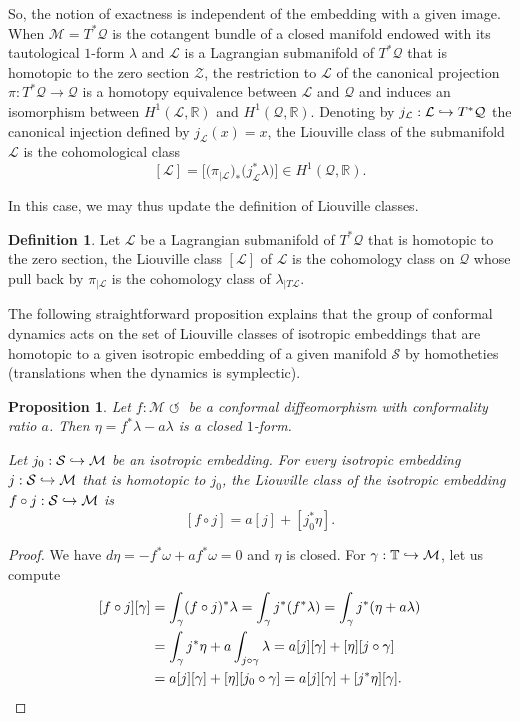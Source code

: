 \documentclass[11pt]{article}
\numberwithin{equation}{section}
\numberwithin{figure}{section}
\numberwithin{table}{section}
\def\hto{\mathrel{\lhook\joinrel\to}}
\providecommand{\righttoleftarrow}{\mathrel{\circlearrowleft}}
\newtheorem{proposition}{Proposition}
\theoremstyle{definition}
\newtheorem{definition}[theorem]{Definition}
\def\R{\mathbb{R}}
\def\T{\mathbb{T}}
\def\cL{{\mathcal L}}
\def\cM{{\mathcal M}}
\def\cQ{{\mathcal Q}}
\def\cS{{\mathcal S}}
\def\cZ{{\mathcal Z}}
\begin{document}
So, the notion of exactness is independent of the embedding with a given image. When $\cM=T^*\cQ$ is the cotangent bundle of a closed manifold endowed with its tautological $1$-form $\lambda$ and $\cL$ is a Lagrangian submanifold of $T^*\cQ$ that is homotopic to the zero section $\cZ$, the restriction to $\cL$ of the canonical projection $\pi:T^*\cQ\to \cQ$ is a homotopy equivalence between $\cL$ and $\cQ$ and induces an isomorphism between $H^1(\cL,\R)$ and $H^1(\cQ,\R)$. Denoting by $j_\cL:\cL\hto T^*\cQ$ the canonical injection defined by $j_\cL(x)=x$, the Liouville class of the submanifold $\cL$ is the cohomological class
\[
[\cL]=\Big[\big(\pi_{|\cL}\big)_*\big(j_\cL^*\lambda\big)\Big]\in H^1(\cQ,\R).
\]

In this case, we may thus update the definition of Liouville classes.

\begin{definition}
Let $\cL$ be a Lagrangian submanifold of $T^*\cQ$ that is homotopic to the zero section, the Liouville class $[\cL]$ of $\cL$ is the cohomology class on $\cQ$ whose pull back by $\pi_{|\cL}$ is the cohomology class of $\lambda_{|T\cL}$.
\end{definition}

The following straightforward proposition explains that the group of conformal dynamics acts {on the set of} Liouville classes of isotropic embeddings { that are homotopic to a given isotropic embedding } of a given manifold $\cS$ by homotheties (translations when the dynamics is symplectic).

\begin{proposition}\label{Phomothety}
Let $f: \cM \righttoleftarrow$ be a conformal diffeomorphism with conformality ratio $a$. Then $\eta=f^*\lambda-a\lambda$ is a closed $1$-form.

Let $ j_0:\cS\hto\cM$ be an isotropic embedding. For every isotropic embedding $ j:\cS\hto\cM$ that is homotopic to $j_0$, the Liouville class of the isotropic embedding $f\circ j:\cS\hto\cM$ is
\[
[f\circ j]=a[j]+[j_0^*\eta].
\]
\end{proposition}

\begin{proof}
We have $d\eta=-f^*\omega+af^*\omega=0$ and $\eta$ is closed. 
For $\gamma:\T\hto\cM$, let us compute
\[
\begin{split}
[f\circ j][\gamma]&=\int_\gamma(f\circ j)^*\lambda=\int_\gamma j^*(f^*\lambda)=\int_\gamma j^*(\eta +a\lambda)\\
&=\int_\gamma j^*\eta+a\int_{j\circ\gamma} \lambda=a[j][\gamma]+ [\eta][j\circ\gamma]\\
&=a[j][\gamma]+ [\eta][j_0\circ\gamma]=a[j][\gamma]+ [j^*\eta][\gamma].\qedhere
\end{split}
\]
\end{proof}
\end{document}
